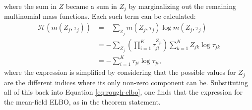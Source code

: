 \documentclass[../../main.tex]{subfiles} %
\begin{document}
where the sum in \(Z\) became a sum in \(Z_j\) by marginalizing out the
remaining multinomial mass functions. Each such term can be calculated:
\begin{align*}
	\mathcal H \left( m \left( Z_j, \tau_j \right) \right) &= -
	\sum_{Z_j} m \left( Z_j, \tau_j \right) \log{m \left( Z_j, \tau_j
		\right)} \\
	&= - \sum_{Z_j} \left( \prod_{i=1}^K \tau_{ji}^{Z_{ji}}\right)
	\sum_{k = 1}^K Z_{jk} \log{\tau_{jk}} \\
	&= - \sum_{i=1}^K \tau_{ji} \log{\tau_{ji}},
\end{align*}
where the expression is simplified by considering that the possible values
for $Z_j$ are the different indices where its only non-zero component can be. 
Substituting all of this back into Equation \eqref{eq:rough-elbo}, one finds 
that the expression for the mean-field ELBO, as in the theorem statement.
\end{document}
